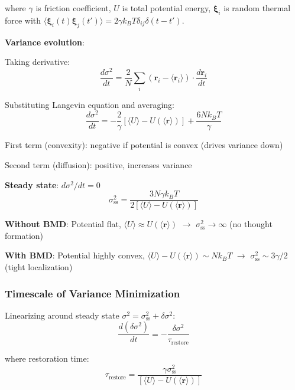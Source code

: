 \documentclass[11pt,onecolumn]{article}
\begin{document}
where $\gamma$ is friction coefficient, $U$ is total potential energy, $\boldsymbol{\xi}_i$ is random thermal force with $\langle\boldsymbol{\xi}_i(t)\boldsymbol{\xi}_j(t')\rangle = 2\gamma k_B T \delta_{ij}\delta(t-t')$.

\textbf{Variance evolution}:

Taking derivative:
\begin{equation}
\frac{d\sigma^2}{dt} = \frac{2}{N}\sum_i (\mathbf{r}_i - \langle\mathbf{r}_i\rangle) \cdot \frac{d\mathbf{r}_i}{dt}
\end{equation}

Substituting Langevin equation and averaging:
\begin{equation}
\frac{d\sigma^2}{dt} = -\frac{2}{\gamma}\left[\langle U\rangle - U(\langle\mathbf{r}\rangle)\right] + \frac{6Nk_BT}{\gamma}
\end{equation}

First term (convexity): negative if potential is convex (drives variance down)

Second term (diffusion): positive, increases variance

\textbf{Steady state}: $d\sigma^2/dt = 0$
\begin{equation}
\sigma_{\text{ss}}^2 = \frac{3N\gamma k_B T}{2[\langle U\rangle - U(\langle\mathbf{r}\rangle)]}
\end{equation}

\textbf{Without BMD}: Potential flat, $\langle U\rangle \approx U(\langle\mathbf{r}\rangle)$ $\to$ $\sigma_{\text{ss}}^2 \to \infty$ (no thought formation)

\textbf{With BMD}: Potential highly convex, $\langle U\rangle - U(\langle\mathbf{r}\rangle) \sim Nk_BT$ $\to$ $\sigma_{\text{ss}}^2 \sim 3\gamma / 2$ (tight localization)

\subsubsection{Timescale of Variance Minimization}

Linearizing around steady state $\sigma^2 = \sigma_{\text{ss}}^2 + \delta\sigma^2$:
\begin{equation}
\frac{d(\delta\sigma^2)}{dt} = -\frac{\delta\sigma^2}{\tau_{\text{restore}}}
\end{equation}

where restoration time:
\begin{equation}
\tau_{\text{restore}} = \frac{\gamma\sigma_{\text{ss}}^2}{[\langle U\rangle - U(\langle\mathbf{r}\rangle)]}
\end{equation}
\end{document}
